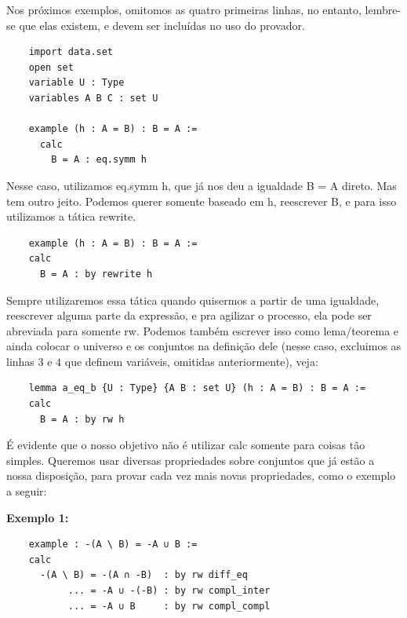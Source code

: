 Nos próximos exemplos, omitomos as quatro primeiras linhas, no entanto, lembre-se que elas existem, e devem ser incluídas no uso do provador.

\begin{lstlisting}
    import data.set
    open set
    variable U : Type
    variables A B C : set U

    example (h : A = B) : B = A :=
      calc
        B = A : eq.symm h
\end{lstlisting}

Nesse caso, utilizamos {\selectfont eq.symm h}, que já nos deu a igualdade {\selectfont B = A} direto. Mas tem outro jeito. Podemos querer somente baseado em {\selectfont h}, reescrever {\selectfont B}, e para isso utilizamos a tática {\selectfont rewrite}.

  \begin{lstlisting}
    example (h : A = B) : B = A :=
    calc
      B = A : by rewrite h \end{lstlisting}

  Sempre utilizaremos essa tática quando quisermos a partir de uma igualdade, reescrever alguma parte da expressão, e pra agilizar o processo, ela pode ser abreviada para somente {\selectfont rw}.
  Podemos também escrever isso como lema/teorema e ainda colocar o universo e os conjuntos na definição dele (nesse caso, excluimos as linhas $3$ e $4$ que definem variáveis, omitidas anteriormente), veja:

  \begin{lstlisting}
    lemma a_eq_b {U : Type} {A B : set U} (h : A = B) : B = A :=
    calc
      B = A : by rw h \end{lstlisting}

  É evidente que o nosso objetivo não é utilizar {\selectfont calc} somente para coisas tão simples. Queremos usar diversas propriedades sobre conjuntos que já estão a nossa disposição, para provar cada vez mais novas propriedades, como o exemplo a seguir:

  \textbf{Exemplo 1:}
  \begin{lstlisting}
    example : -(A \ B) = -A ∪ B :=
    calc
      -(A \ B) = -(A ∩ -B)  : by rw diff_eq
           ... = -A ∪ -(-B) : by rw compl_inter
           ... = -A ∪ B     : by rw compl_compl \end{lstlisting}


